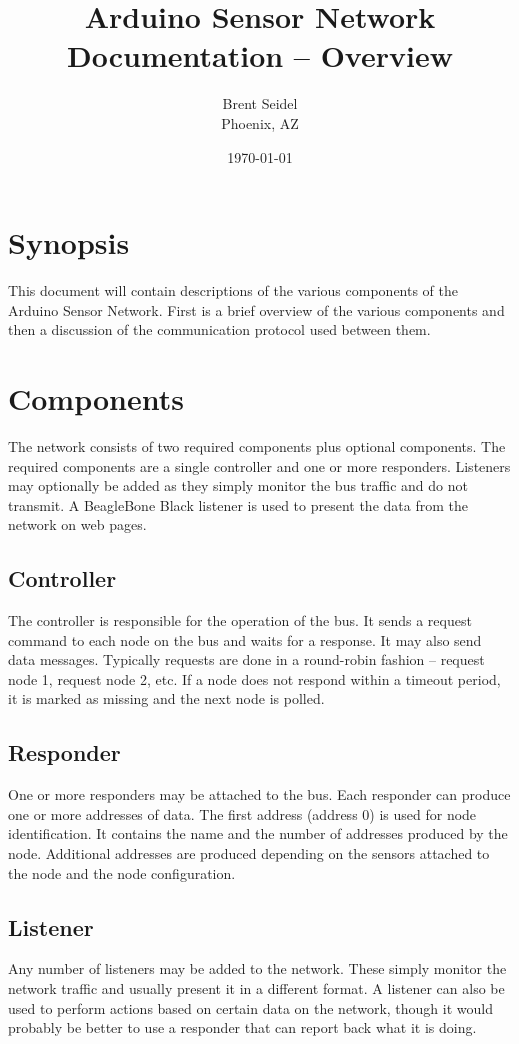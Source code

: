 \documentclass[10pt, openany, draft]{article}
\title{Arduino Sensor Network Documentation -- Overview}
\author{Brent Seidel \\ Phoenix, AZ}
\date{ \today }
\begin{document}
\maketitle
\section{Synopsis}
This document will contain descriptions of the various components of the Arduino Sensor Network.  First is a brief overview of the various components and then a discussion of the communication protocol used between them.

\section{Components}
The network consists of two required components plus optional components.  The required components are a single controller and one or more responders.  Listeners may optionally be added as they simply monitor the bus traffic and do not transmit.  A BeagleBone Black listener is used to present the data from the network on web pages.

\subsection{Controller}
The controller is responsible for the operation of the bus.  It sends a request command to each node on the bus and waits for a response.  It may also send data messages.  Typically requests are done in a round-robin fashion -- request node 1, request node 2, etc.  If a node does not respond within a timeout period, it is marked as missing and the next node is polled.

\subsection{Responder}
One or more responders may be attached to the bus.  Each responder can produce one or more addresses of data.  The first address (address 0) is used for node identification.  It contains the name and the number of addresses produced by the node.  Additional addresses are produced depending on the sensors attached to the node and the node configuration.

\subsection{Listener}
Any number of listeners may be added to the network.  These simply monitor the network traffic and usually present it in a different format.  A listener can also be used to perform actions based on certain data on the network, though it would probably be better to use a responder that can report back what it is doing.
\end{document}
